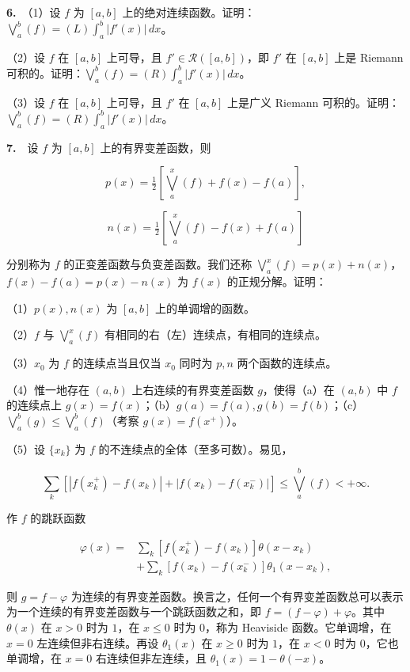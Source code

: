 \documentclass[11pt,a4paper]{article}
\begin{document}
\par{}\noindent \textbf{6.}　（1）设 \(f\) 为 \([a,b]\) 上的绝对连续函数。证明：\(\bigvee_a^b(f)=(L)\int_a^b|f'(x)|\,dx\)。

（2）设 \(f\) 在 \([a,b]\) 上可导，且 \(f'\in\mathcal R([a,b])\)，即 \(f'\) 在 \([a,b]\) 上是 Riemann 可积的。证明：\(\bigvee_a^b(f)=(R)\int_a^b|f'(x)|\,dx\)。

（3）设 \(f\) 在 \([a,b]\) 上可导，且 \(f'\) 在 \([a,b]\) 上是广义 Riemann 可积的。证明：\(\bigvee_a^b(f)=(R)\int_a^b|f'(x)|\,dx\)。

\par{}\noindent \textbf{7.}　设 \(f\) 为 \([a,b]\) 上的有界变差函数，则

\[
p(x)=\tfrac12\left[\bigvee_a^x(f)+f(x)-f(a)\right],
\]

\[
n(x)=\tfrac12\left[\bigvee_a^x(f)-f(x)+f(a)\right]
\]

分别称为 \(f\) 的正变差函数与负变差函数。我们还称 \(\bigvee_a^x(f)=p(x)+n(x)\)，\(f(x)-f(a)=p(x)-n(x)\) 为 \(f(x)\) 的正规分解。证明：

（1）\(p(x),n(x)\) 为 \([a,b]\) 上的单调增的函数。

（2）\(f\) 与 \(\bigvee_a^x(f)\) 有相同的右（左）连续点，有相同的连续点。

（3）\(x_0\) 为 \(f\) 的连续点当且仅当 \(x_0\) 同时为 \(p,n\) 两个函数的连续点。

（4）惟一地存在 \((a,b)\) 上右连续的有界变差函数 \(g\)，使得（a）在 \((a,b)\) 中 \(f\) 的连续点上 \(g(x)=f(x)\)；（b）\(g(a)=f(a),g(b)=f(b)\)；（c）\(\bigvee_a^b(g)\le\bigvee_a^b(f)\)（考察 \(g(x)=f(x^+)\)）。

（5）设 \(\{x_k\}\) 为 \(f\) 的不连续点的全体（至多可数）。易见，

\[
\sum_k[|f(x_k^+)-f(x_k)|+|f(x_k)-f(x_k^-)|]\le\bigvee_a^b(f)<+\infty.
\]

作 \(f\) 的跳跃函数

\[
\begin{aligned}\varphi(x)={}&\sum_k[f(x_k^+)-f(x_k)]\theta(x-x_k)\\&+\sum_k[f(x_k)-f(x_k^-)]\theta_1(x-x_k),\end{aligned}
\]

则 \(g=f-\varphi\) 为连续的有界变差函数。换言之，任何一个有界变差函数总可以表示为一个连续的有界变差函数与一个跳跃函数之和，即 \(f=(f-\varphi)+\varphi\)。其中 \(\theta(x)\) 在 \(x>0\) 时为 \(1\)，在 \(x\le0\) 时为 \(0\)，称为 Heaviside 函数。它单调增，在 \(x=0\) 左连续但非右连续。再设 \(\theta_1(x)\) 在 \(x\ge0\) 时为 \(1\)，在 \(x<0\) 时为 \(0\)，它也单调增，在 \(x=0\) 右连续但非左连续，且 \(\theta_1(x)=1-\theta(-x)\)。
\end{document}
